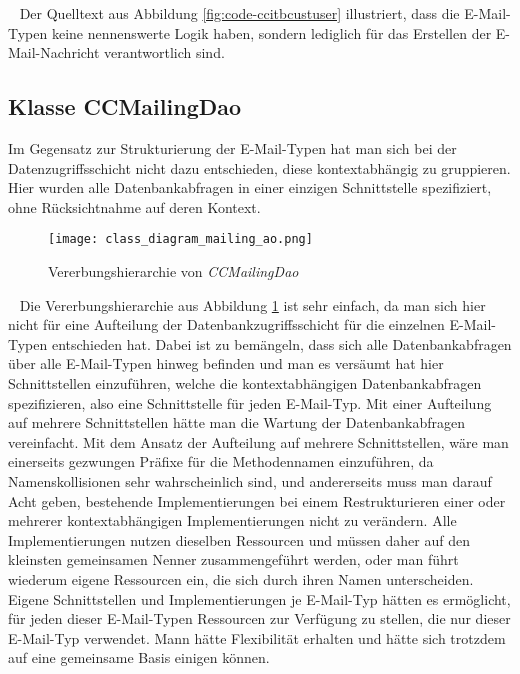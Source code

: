 \ \newline
Der Quelltext aus Abbildung \ref{fig:code-ccitbcustuser} illustriert, dass die E-Mail-Typen keine nennenswerte Logik haben, sondern lediglich für das Erstellen der E-Mail-Nachricht verantwortlich sind. 

\subsection{Klasse CCMailingDao}
Im Gegensatz zur Strukturierung der E-Mail-Typen hat man sich bei der Datenzugriffsschicht nicht dazu entschieden, diese kontextabhängig zu gruppieren. Hier wurden alle Datenbankabfragen in einer einzigen Schnittstelle spezifiziert, ohne Rücksichtnahme auf deren Kontext.
\newline
\begin{figure}[h]
\centering
\texttt{[image: class\_diagram\_mailing\_ao.png]} 
\caption{Vererbungshierarchie von \emph{CCMailingDao}}
\label{fig:klassen-hierarchie-ccmailingdao}
\end{figure}
\ \newline
Die Vererbungshierarchie aus Abbildung \ref{fig:klassen-hierarchie-ccmailingdao} ist sehr einfach, da man sich hier nicht für eine Aufteilung der Datenbankzugriffsschicht für die einzelnen E-Mail-Typen entschieden hat. Dabei ist zu bemängeln, dass sich alle Datenbankabfragen über alle E-Mail-Typen hinweg befinden und man es versäumt hat hier Schnittstellen einzuführen, welche die kontextabhängigen Datenbankabfragen spezifizieren,  also eine Schnittstelle für jeden E-Mail-Typ. Mit einer Aufteilung auf mehrere Schnittstellen hätte man die Wartung der Datenbankabfragen vereinfacht. Mit dem Ansatz der Aufteilung auf mehrere Schnittstellen, wäre man einerseits gezwungen Präfixe für die Methodennamen einzuführen, da Namenskollisionen sehr wahrscheinlich sind, und andererseits muss man darauf Acht geben, bestehende Implementierungen bei einem Restrukturieren einer oder mehrerer kontextabhängigen Implementierungen nicht zu verändern. 
\newline
\newline
Alle Implementierungen nutzen dieselben Ressourcen und müssen daher auf den kleinsten gemeinsamen Nenner zusammengeführt werden, oder man führt wiederum eigene Ressourcen ein, die sich durch ihren Namen unterscheiden. 
\newline
\newline
Eigene Schnittstellen und Implementierungen je E-Mail-Typ hätten es ermöglicht, für jeden dieser E-Mail-Typen Ressourcen zur Verfügung zu stellen, die nur dieser E-Mail-Typ verwendet. Mann hätte Flexibilität erhalten und hätte sich trotzdem auf eine gemeinsame Basis einigen können. 
